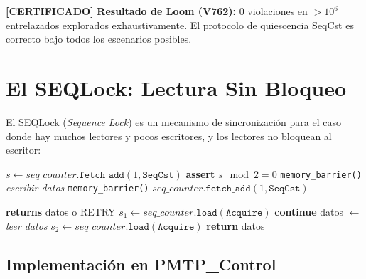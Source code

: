 \textbf{[CERTIFICADO]} 
\textbf{Resultado de Loom (V762):}
$0$ violaciones en $> 10^6$ entrelazados explorados exhaustivamente.
El protocolo de quiescencia SeqCst es correcto bajo todos los escenarios posibles.


\section{El SEQLock: Lectura Sin Bloqueo}

El SEQLock (\textit{Sequence Lock}) es un mecanismo de sincronización para el caso
donde hay muchos lectores y pocos escritores, y los lectores no bloquean al escritor:

\begin{algorithm}

\begin{algorithmic}[1]
  \State $s \gets seq\_counter.\texttt{fetch\_add}(1, \texttt{SeqCst})$ 
  \State \textbf{assert} $s \mod 2 = 0$ 
  \State \texttt{memory\_barrier()} 
  \State \textit{escribir datos}
  \State \texttt{memory\_barrier()} 
  \State $seq\_counter.\texttt{fetch\_add}(1, \texttt{SeqCst})$ 
\EndProcedure
\end{algorithmic}
\end{algorithm}

\begin{algorithm}

\begin{algorithmic}[1]
 \textbf{returns} datos o RETRY
  \Repeat
    \State $s_1 \gets seq\_counter.\texttt{load}(\texttt{Acquire})$
      \State \textbf{continue} 
    \EndIf
    \State datos $\gets$ \textit{leer datos}
    \State $s_2 \gets seq\_counter.\texttt{load}(\texttt{Acquire})$
      \State \textbf{return} datos 
    \EndIf
   
\EndProcedure
\end{algorithmic}
\end{algorithm}

\subsection{Implementación en PMTP\_Control}


